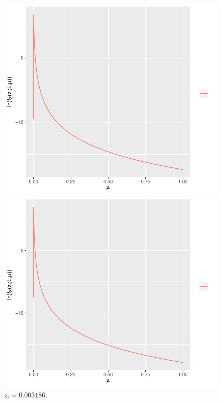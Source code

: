 \documentclass[journal,article,submit,moreauthors,pdftex]{Definitions/mdpi}
\begin{document}
\begin{figure}[hbt]
  \includegraphics[width=\linewidth]{func_max_ver_L_4_z_50_flev_wishart.pdf}
  	\caption{$z_i= 0.007097$.}\label{func_max_ver_L_4_z_50_flev_wishart}
\endminipage\hfill
{}
  \includegraphics[width=\linewidth]{func_max_ver_L_4_z_60_flev_wishart.pdf}
		\caption{$z_i=0.003186$.}\label{func_max_ver_L_4_z_60_flev_wishart}

\end{figure}
\end{document}
